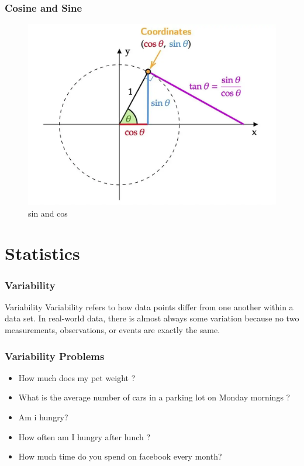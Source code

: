 \documentclass{beamer}
\begin{document}
    \begin{frame}
        \frametitle{Cosine and Sine}
        \begin{figure}[h]    
            \begin{minipage}[b]{0.8\textwidth}
            \centering
            \includegraphics[scale=0.22]{8.png}
            \caption{sin and cos}
        \end{minipage}
    \end{figure}
    \end{frame}


\section{Statistics}
\begin{frame}
    \frametitle{Variability}
    \begin{block}{Variability}
        Variability refers to how data points differ from one another within a data set. In real-world data, there is almost always some variation because no two measurements, observations, or events are exactly the same.
    \end{block}
\end{frame}

\begin{frame}
    \frametitle{Variability Problems}
        \begin{itemize}
            \item How much does my pet weight ?
            \item What is the average number of cars in a parking lot on Monday mornings ?
            \item Am i hungry?
            \item How often am I hungry after lunch ? 
            \item How much time do you spend on facebook every month? 
        \end{itemize}
\end{frame}
\end{document}
